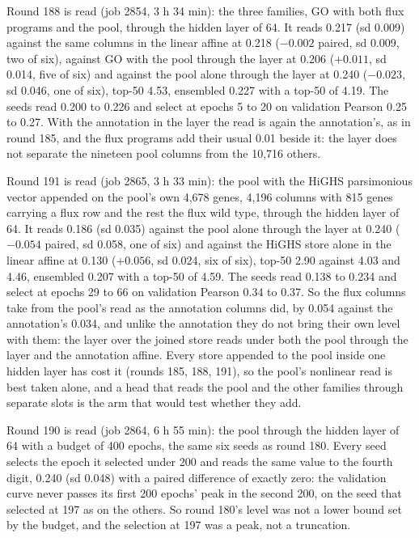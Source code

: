 Round 188 is read (job 2854, 3 h 34 min): the three families, GO with both flux
programs and the pool, through the hidden layer of 64. It reads 0.217 (sd 0.009)
against the same columns in the linear affine at 0.218 ($-0.002$ paired, sd 0.009, two
of six), against GO with the pool through the layer at 0.206 ($+0.011$, sd 0.014, five
of six) and against the pool alone through the layer at 0.240 ($-0.023$, sd 0.046, one
of six), top-50 4.53, ensembled 0.227 with a top-50 of 4.19. The seeds read 0.200 to
0.226 and select at epochs 5 to 20 on validation Pearson 0.25 to 0.27. With the
annotation in the layer the read is again the annotation's, as in round 185, and the
flux programs add their usual 0.01 beside it: the layer does not separate the nineteen
pool columns from the 10,716 others.

Round 191 is read (job 2865, 3 h 33 min): the pool with the HiGHS parsimonious vector
appended on the pool's own 4,678 genes, 4,196 columns with 815 genes carrying a flux
row and the rest the flux wild type, through the hidden layer of 64. It reads 0.186
(sd 0.035) against the pool alone through the layer at 0.240 ($-0.054$ paired, sd
0.058, one of six) and against the HiGHS store alone in the linear affine at 0.130
($+0.056$, sd 0.024, six of six), top-50 2.90 against 4.03 and 4.46, ensembled 0.207
with a top-50 of 4.59. The seeds read 0.138 to 0.234 and select at epochs 29 to 66 on
validation Pearson 0.34 to 0.37. So the flux columns take from the pool's read as the
annotation columns did, by 0.054 against the annotation's 0.034, and unlike the
annotation they do not bring their own level with them: the layer over the joined
store reads under both the pool through the layer and the annotation affine. Every
store appended to the pool inside one hidden layer has cost it (rounds 185, 188, 191),
so the pool's nonlinear read is best taken alone, and a head that reads the pool and
the other families through separate slots is the arm that would test whether they add.

Round 190 is read (job 2864, 6 h 55 min): the pool through the hidden layer of 64
with a budget of 400 epochs, the same six seeds as round 180. Every seed selects the
epoch it selected under 200 and reads the same value to the fourth digit, 0.240 (sd
0.048) with a paired difference of exactly zero: the validation curve never passes its
first 200 epochs' peak in the second 200, on the seed that selected at 197 as on the
others. So round 180's level was not a lower bound set by the budget, and the
selection at 197 was a peak, not a truncation.

